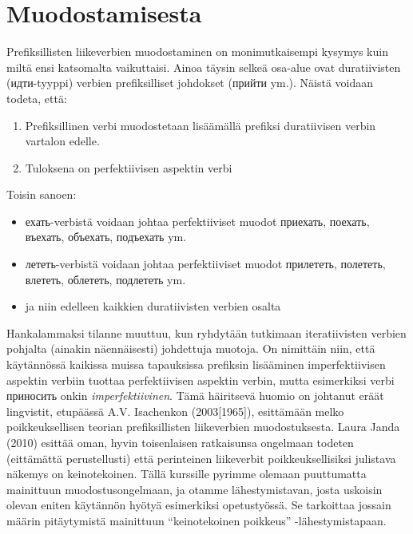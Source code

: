 \documentclass[]{scrreprt}
\providecommand{\tightlist}{%
  \setlength{\itemsep}{0pt}\setlength{\parskip}{0pt}}
\begin{document}
\section{Muodostamisesta}\label{muodostamisesta}

Prefiksillisten liikeverbien muodostaminen on monimutkaisempi kysymys
kuin miltä ensi katsomalta vaikuttaisi. Ainoa täysin selkeä osa-alue
ovat duratiivisten (идти-tyyppi) verbien prefiksilliset johdokset
(прийти ym.). Näistä voidaan todeta, että:

\begin{enumerate}
\def\labelenumi{\arabic{enumi}.}
\tightlist
\item
  Prefiksillinen verbi muodostetaan lisäämällä prefiksi duratiivisen
  verbin vartalon edelle.
\item
  Tuloksena on perfektiivisen aspektin verbi
\end{enumerate}

Toisin sanoen:

\begin{itemize}
\tightlist
\item
  ехать-verbistä voidaan johtaa perfektiiviset muodot приехать, поехать,
  въехать, объехать, подъехать ym.
\item
  лететь-verbistä voidaan johtaa perfektiiviset muodot прилететь,
  полететь, влететь, облететь, подлететь ym.
\item
  ja niin edelleen kaikkien duratiivisten verbien osalta
\end{itemize}

Hankalammaksi tilanne muuttuu, kun ryhdytään tutkimaan iteratiivisten
verbien pohjalta (ainakin näennäisesti) johdettuja muotoja. On nimittäin
niin, että käytännössä kaikissa muissa tapauksissa prefiksin lisääminen
imperfektiivisen aspektin verbiin tuottaa perfektiivisen aspektin
verbin, mutta esimerkiksi verbi приносить onkin \emph{imperfektiivinen}.
Tämä häiritsevä huomio on johtanut eräät lingvistit, etupäässä A.V.
Isachenkon (2003{[}1965{]}), esittämään melko poikkeuksellisen teorian
prefiksillisten liikeverbien muodostuksesta. Laura Janda (2010) esittää
oman, hyvin toisenlaisen ratkaisunsa ongelmaan todeten (eittämättä
perustellusti) että perinteinen liikeverbit poikkeuksellisiksi julistava
näkemys on keinotekoinen. Tällä kurssille pyrimme olemaan puuttumatta
mainittuun muodostusongelmaan, ja otamme lähestymistavan, josta uskoisin
olevan eniten käytännön hyötyä esimerkiksi opetustyössä. Se tarkoittaa
jossain määrin pitäytymistä mainittuun ``keinotekoinen poikkeus''
-lähestymistapaan.
\end{document}

